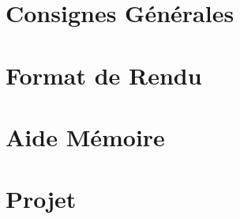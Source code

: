 \documentclass[12pt,a4paper]{article}
\begin{document}
\maketitle





\newpage

\tableofcontents

\newpage

\section{Consignes Générales}

\bigskip



\newpage

\section{Format de Rendu}
\label{sec:FormatDeRendu}

\vspace*{1cm}



\newpage

\section{Aide Mémoire}
\label{sec:AideMemoire}

\vspace*{1cm}




\newpage


\section{Projet}

\vspace*{0.7cm}






%
\end{document}
